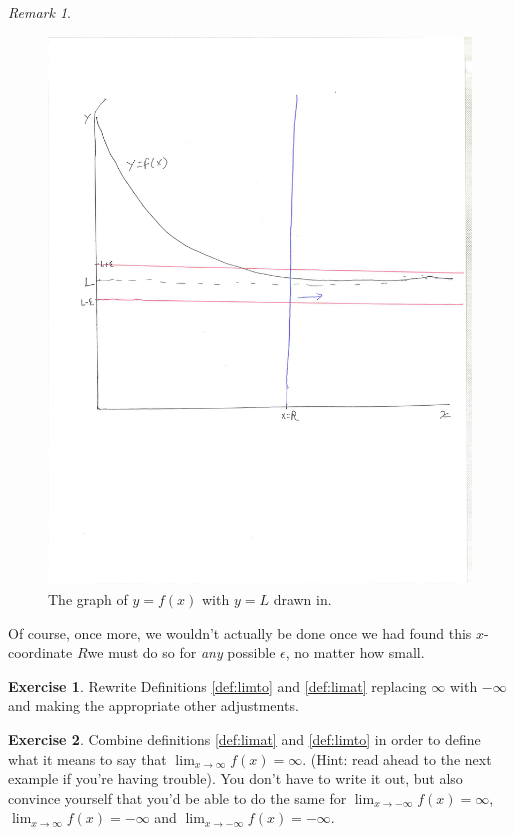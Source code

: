 \documentclass[english]{book}
\theoremstyle{remark}
\newtheorem{remark}{Remark}[theorem]
\theoremstyle{definition}
\newtheorem{excs}{Exercise}
\newtheorem*{next week}{Next Week}
\newcommand{\dlim}{\displaystyle\lim}
\begin{document}
\begin{remark}
\begin{figure}[h!]\centering
	\includegraphics[scale=0.5,trim={0 3.3in 12mm 36mm},clip]{1graph6} \caption{The graph of $y=f(x)$ with $y=L$ drawn in.\label{fig:1graph6}}
\end{figure}

Of course, once more, we wouldn't actually be done once we had found this $x$-coordinate $R$\textemdash we must do so for \emph{any} possible $\epsilon$, no matter how small.
\end{remark}
\begin{excs}
	Rewrite Definitions \ref{def:limto} and \ref{def:limat} replacing $\infty$ with $-\infty$ and making the appropriate other adjustments.
\end{excs}
\begin{excs}
Combine definitions \ref{def:limat} and \ref{def:limto} in order to define what it means to say that $\dlim_{x\to \infty}f(x)=\infty$. (Hint: read ahead to the next example if you're having trouble). You don't have to write it out, but also convince yourself that you'd be able to do the same for $\dlim_{x\to -\infty}f(x)=\infty$, $\dlim_{x\to \infty} f(x)=-\infty$ and $\dlim_{x\to -\infty} f(x)=-\infty$.  
\end{excs}
\end{document}
